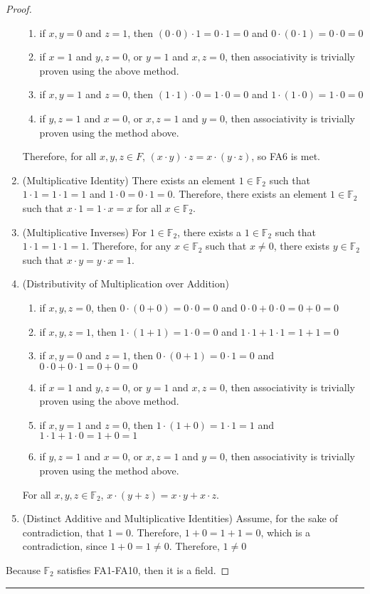 \documentclass[openany, amssymb, psamsfonts]{amsart}
\newcommand{\bbF}{\mathbb{F}}
\theoremstyle{definition}
\numberwithin{equation}{section}
\begin{document}
\begin{proof}
\begin{enumerate}[1]
\begin{enumerate}
      \item if $x,y = 0$ and $z=1$, then $(0\cdot0) \cdot1 = 0\cdot1 = 0$ and $0\cdot(0\cdot1) = 0\cdot0 =0$
      \item if $x =1$ and $y,z=0$, or $y=1$ and $x,z = 0$, then associativity is trivially proven using the above method.
      \item if $x,y =1$ and $z=0$, then $(1\cdot1)\cdot0 = 1\cdot0 = 0$ and $1\cdot(1\cdot0) = 1\cdot0 = 0$
      \item if $y,z =1$ and $x=0$, or $x,z=1$ and $y=0$, then associativity is trivially proven using the method above.
  \end{enumerate}
 Therefore, for all $x,y,z\in F$, $(x \cdot y) \cdot z = x\cdot (y \cdot z)$, so FA6 is met.
		\item  (Multiplicative Identity)  There exists an element $1 \in \bbF_2$ such that $1 \cdot 1 = 1 \cdot 1 = 1$ and $1\cdot 0 = 0\cdot 1= 0$. Therefore, there exists an element $1 \in \bbF_2$ such that $x \cdot 1 = 1 \cdot x = x$ for all $x \in \bbF_2$.
		\item  (Multiplicative Inverses)  For $1\in \bbF_2$, there exists a $1\in \bbF_2$ such that $1 \cdot 1 = 1\cdot 1 = 1$. Therefore, for any $x \in \bbF_2$ such that $x \neq 0$, there exists $y \in \bbF_2$ such that $x \cdot y = y \cdot x = 1$.
		\item  (Distributivity of Multiplication over Addition)
  \begin{enumerate}
      \item if $x,y,z =0$, then $0\cdot(0+ 0) = 0\cdot 0 =0$ and $0\cdot 0 + 0\cdot0 = 0+0=0$
      \item if $x,y,z =1$, then $1\cdot(1+ 1) = 1\cdot 0 =0$ and $1\cdot 1 + 1\cdot1 = 1+1=0$
      \item if $x,y = 0$ and $z=1$, then $0\cdot(0+ 1) = 0\cdot 1 =0$ and $0\cdot 0 + 0\cdot1 = 0+0=0$
      \item if $x =1$ and $y,z=0$, or $y=1$ and $x,z = 0$, then associativity is trivially proven using the above method.
      \item if $x,y =1$ and $z=0$, then $1\cdot(1+ 0) = 1\cdot 1 =1$ and $1\cdot 1 + 1\cdot0 = 1+0=1$
      \item if $y,z =1$ and $x=0$, or $x,z=1$ and $y=0$, then associativity is trivially proven using the method above.
  \end{enumerate}
  For all $x, y, z \in \bbF_2$,
		$x \cdot(y + z) = x \cdot y + x \cdot z$. 
		\item  (Distinct Additive and Multiplicative Identities)  Assume, for the sake of contradiction, that $1=0$. Therefore, $1+0=1+1=0$, which is a contradiction, since $1+0 = 1 \neq 0$. Therefore, $1\neq 0$
\end{enumerate}
Because $\bbF_2$ satisfies FA1-FA10, then it is a field.
\end{proof}		
\vspace{4pt}     \hrule   \vspace{4pt}
\end{document}

